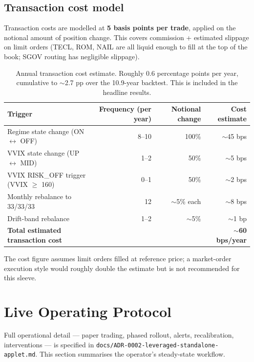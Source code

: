 \documentclass[11pt,a4paper]{article}
\begin{document}
\subsection{Transaction cost model}

Transaction costs are modelled at \textbf{5 basis points per trade}, applied on the notional amount of position change. This covers commission + estimated slippage on limit orders (TECL, ROM, NAIL are all liquid enough to fill at the top of the book; SGOV routing has negligible slippage).

\begin{table}[H]
\centering
\small
\begin{tabular}{lrrr}
\toprule
\textbf{Trigger} & \textbf{Frequency (per year)} & \textbf{Notional change} & \textbf{Cost estimate} \\
\midrule
Regime state change (ON $\leftrightarrow$ OFF)   & 8--10 & 100\% & $\sim$45 bps \\
VVIX state change (UP $\leftrightarrow$ MID)     & 1--2  & 50\%  & $\sim$5 bps \\
VVIX RISK\_OFF trigger (VVIX $\geq$ 160)         & 0--1  & 50\%  & $\sim$2 bps \\
Monthly rebalance to 33/33/33                    & 12    & $\sim$5\% each & $\sim$8 bps \\
Drift-band rebalance                             & 1--2  & $\sim$5\% & $\sim$1 bp \\
\midrule
\textbf{Total estimated transaction cost}        &       &       & \textbf{$\sim$60 bps/year} \\
\bottomrule
\end{tabular}
\caption{Annual transaction cost estimate. Roughly 0.6 percentage points per year, cumulative to $\sim$2.7 pp over the 10.9-year backtest. This is included in the headline results.}
\end{table}

The cost figure assumes limit orders filled at reference price; a market-order execution style would roughly double the estimate but is not recommended for this sleeve.

\section{Live Operating Protocol}

Full operational detail --- paper trading, phased rollout, alerts, recalibration, interventions --- is specified in \verb|docs/ADR-0002-leveraged-standalone-applet.md|. This section summarises the operator's steady-state workflow.
\end{document}
